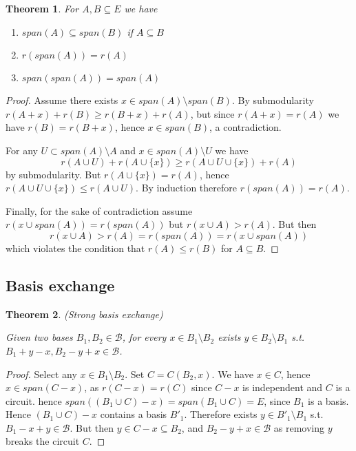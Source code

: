 \documentclass{article}
\newtheorem{theorem}{Theorem}[section]
\begin{document}
\begin{theorem}
For $A, B \subseteq E$ we have
\begin{enumerate}
	\item $span(A) \subseteq span(B)$ if $A \subseteq B$
	\item $r(span(A)) = r(A)$
	\item $span(span(A)) = span(A)$
\end{enumerate}
\end{theorem}
\begin{proof}
Assume there exists $x \in span(A) \setminus span(B)$. By submodularity $r(A + x) + r(B) \geq r(B + x) + r(A)$,
but since $r(A + x) = r(A)$ we have $r(B) = r(B + x)$, hence $x \in span(B)$, a contradiction.

For any $U \subset span(A) \setminus A$ and $x \in span(A) \setminus U$ we have
\begin{equation*}
r(A \cup U) + r(A \cup \{x\}) \geq r(A \cup U \cup \{x\}) + r(A)
\end{equation*}
by submodularity. But $r(A \cup \{x\}) = r(A)$, hence $r(A \cup U \cup \{x\}) \leq r(A \cup U)$.
By induction therefore $r(span(A)) = r(A)$.

Finally, for the sake of contradiction assume $r(x \cup span(A)) = r(span(A))$ but $r(x \cup A) > r(A)$. But then
\begin{equation*}
r(x \cup A) > r(A) = r(span(A)) = r(x \cup span(A))
\end{equation*}
which violates the condition that $r(A) \leq r(B)$ for $A \subseteq B$.
\end{proof}

\subsection{Basis exchange}
\begin{theorem}
(Strong basis exchange)

Given two bases $B_{1}, B_{2} \in \mathcal{B}$, for every $x \in B_{1} \setminus B_{2}$ exists $y \in B_{2} \setminus B_{1}$
s.t. $B_{1} + y - x, B_{2} - y + x \in \mathcal{B}$.
\end{theorem}
\begin{proof}
Select any $x \in B_{1} \setminus B_{2}$. Set $C = C(B_{2}, x)$. We have $x \in C$, hence $x \in span(C - x)$,
as $r(C - x) = r(C)$ since $C - x$ is independent and $C$ is a circuit. hence $span((B_{1} \cup C) - x) = span(B_{1} \cup C) = E$,
since $B_{1}$ is a basis. Hence $(B_{1} \cup C) - x$ contains a basis $B'_{1}$. Therefore exists $y \in B'_{1} \setminus B_{1}$ s.t.
$B_{1} - x + y \in \mathcal{B}$. But then $y \in C - x \subseteq B_{2}$, and $B_{2} - y + x \in \mathcal{B}$ as removing $y$ breaks the circuit $C$.
\end{proof}
\end{document}
